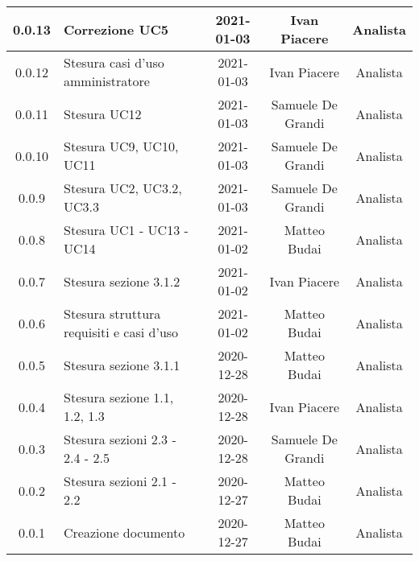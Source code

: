 \begin{center}
\begin{longtable}{|c|p{5cm}|c|c|c|}
		\hline
		0.0.13 & Correzione UC5 & 2021-01-03 & Ivan Piacere & Analista \\
		\hline
		0.0.12 & Stesura casi d'uso amministratore & 2021-01-03 & Ivan Piacere & Analista \\
		\hline
		0.0.11 & Stesura UC12  & 2021-01-03 & Samuele De Grandi & Analista \\
		\hline
	    0.0.10 & Stesura UC9, UC10, UC11  & 2021-01-03 & Samuele De Grandi & Analista \\
		\hline
		0.0.9 & Stesura UC2, UC3.2, UC3.3  & 2021-01-03 & Samuele De Grandi & Analista \\
		\hline
		0.0.8 & Stesura UC1 - UC13 - UC14 & 2021-01-02 & Matteo Budai & Analista \\
		\hline
		0.0.7 & Stesura sezione 3.1.2 & 2021-01-02 & Ivan Piacere & Analista\\
		\hline
		0.0.6 & Stesura struttura requisiti e casi d'uso & 2021-01-02 & Matteo Budai & Analista \\
		\hline
		0.0.5 & Stesura sezione 3.1.1 & 2020-12-28 & Matteo Budai & Analista \\
		\hline
		0.0.4 & Stesura sezione 1.1, 1.2, 1.3 & 2020-12-28 & Ivan Piacere & Analista \\
		\hline
		0.0.3 & Stesura sezioni 2.3 - 2.4 - 2.5 & 2020-12-28 & Samuele De Grandi & Analista \\
		\hline
		0.0.2 & Stesura sezioni 2.1 - 2.2 & 2020-12-27 & Matteo Budai & Analista \\
		\hline
		0.0.1 & Creazione documento & 2020-12-27 & Matteo Budai & Analista \\
		\hline
		
	\end{longtable}
\end{center}
